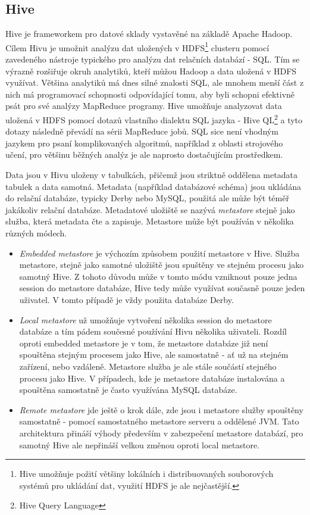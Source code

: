 \documentclass[11pt,twoside,a4paper]{book}
\begin{document}
		\subsection{Hive} \label{sec:hive}
			Hive je frameworkem pro datové sklady vystavěné na základě Apache Hadoop. Cílem Hivu je umožnit analýzu dat uložených v HDFS\footnote{Hive umožňuje požití většiny lokálních i distribuovaných souborových systémů pro ukládání dat, využití HDFS je ale nejčastější.} clusteru pomocí zavedeného nástroje typického pro analýzu dat relačních databází - SQL. Tím se výrazně rozšiřuje okruh analytiků, kteří můžou Hadoop a data uložená v HDFS využívat. Většina analytiků má dnes silné znalosti SQL, ale mnohem menší část z nich má programovací schopnosti odpovídající tomu, aby byli schopni efektivně psát pro své analýzy MapReduce programy. Hive umožňuje analyzovat data uložená v HDFS pomocí dotazů vlastního dialektu SQL jazyka - Hive QL\footnote{Hive Query Language}\cite{hiveql01} a tyto dotazy následně převádí na sérii MapReduce jobů. SQL sice není vhodným jazykem pro psaní komplikovaných algoritmů, například z oblasti strojového učení, pro většinu běžných analýz je ale naprosto dostačujícím prostředkem. 

			Data jsou v Hivu uloženy v tabulkách, přičemž jsou striktně oddělena metadata tabulek a data samotná. Metadata (například databázové schéma) jsou ukládána do relační databáze, typicky Derby \cite{derby01} nebo MySQL, použitá ale může být téměř jakákoliv relační databáze. Metadatové uložiště se nazývá \textit{metastore} stejně jako služba, která metadata čte a zapisuje. Metastore může být používán v několika různých módech.\cite{white01}
\begin{itemize}
\item{\textit{Embedded metastore} je výchozím způsobem použití metastore v Hive. Služba metastore, stejně jako samotné uložiště jsou spuštěny ve stejném procesu jako samotný Hive. Z tohoto důvodu může v tomto módu vzniknout pouze jedna session do metastore databáze, Hive tedy může využívat současně pouze jeden uživatel. V tomto případě je vždy použita databáze Derby.}
\item{\textit{Local metastore} už umožňuje vytvoření několika session do metastore databáze a tím pádem součesné používání Hivu několika uživateli. Rozdíl oproti embedded metastore je v tom, že metastore databáze již není spouštěna stejným procesem jako Hive, ale samostatně - ať už na stejném zařízení, nebo vzdáleně. Metastore služba je ale stále součástí stejného procesu jako Hive. V případech, kde je metastore databáze instalována a spouštěna samostatně je často využívána MySQL databáze.}
\item{\textit{Remote metastore} jde ještě o krok dále, zde jsou i metastore služby spouštěny samostatně - pomocí samostatného metastore serveru a oddělené JVM. Tato architektura přináší výhody především v zabezpečení metastore databází, pro samotný Hive ale nepřináší velkou změnou oproti local metastore.}
\end{itemize}
\end{document}
